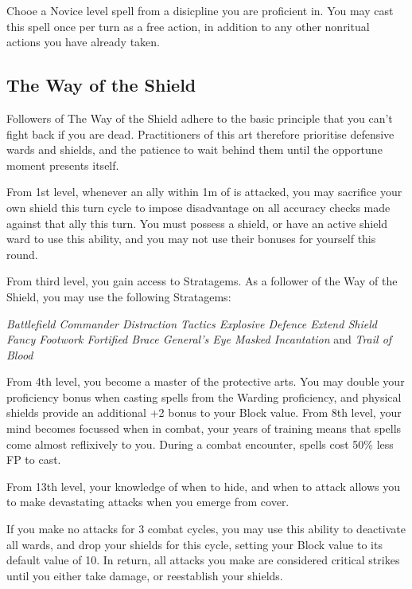 {{Chooe a Novice level spell from a disicpline you are proficient in. You may cast this spell once per turn as a free action, in addition to any other non\minus{}ritual actions you have already taken.
}

\subsection{\bf The Way of the Shield}

Followers of The Way of the Shield adhere to the basic principle that you can't fight back if you are dead. Practitioners of this art therefore prioritise defensive wards and shields, and the patience to wait behind them until the opportune moment presents itself. 


From 1st level, whenever an ally within 1m of is attacked, you may sacrifice your own shield this turn cycle to impose disadvantage on all accuracy checks made against that ally this turn. You must possess a shield, or have an active shield ward to use this ability, and you may not use their bonuses for yourself this round. 



From third level, you gain access to Stratagems. As a follower of the Way of the Shield, you may use the following Stratagems:

{\it 
Battlefield Commander\comma{} Distraction Tactics\comma{} Explosive Defence\comma{} Extend Shield\comma{} Fancy Footwork\comma{} Fortified Brace\comma{} General’s Eye\comma{} Masked Incantation } and {\it Trail of Blood
}

{
	From 4th level, you become a master of the protective arts. 	You may double your proficiency bonus when casting spells from the Warding proficiency, and physical shields provide an additional +2 bonus to your Block value. 
}
{
	From 8th level, your mind becomes focussed when in combat, your years of training means that spells come almost reflixively to you. During a combat encounter, spells cost 50\% less FP to cast. 
}
{
	From 13th level, your knowledge of when to hide, and when to attack allows you to make devastating attacks when you emerge from cover.  
	
	If you make no attacks for 3 combat cycles, you may use this ability to deactivate all wards, and drop your shields for this cycle, setting your Block value to its default value of 10. In return, all attacks you make are considered critical strikes until you either take damage, or re\minus{}establish your shields. 
}

}
